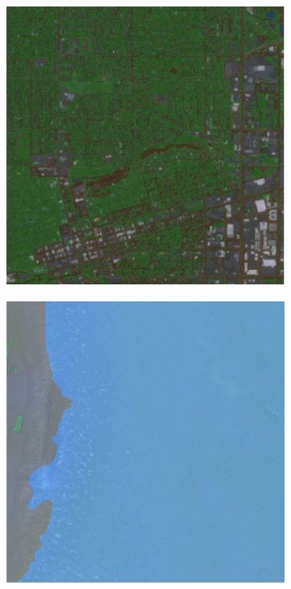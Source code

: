 \documentclass[aspectratio=169,xcolor=dvipsnames]{beamer}
\begin{document}
\begin{frame}

\begin{figure}[ht]
    \centering
    \begin{subfigure}[b]{0.45\textwidth}
        \centering
        \includegraphics[scale=0.35]{image1.png}
        \caption{}
        \label{fig:image1}
    \end{subfigure}\hfill
    \begin{subfigure}[b]{0.45\textwidth}
        \centering
        \includegraphics[scale=0.5]{image2.png}

\end{subfigure}
\end{figure}
\end{frame}
\end{document}
